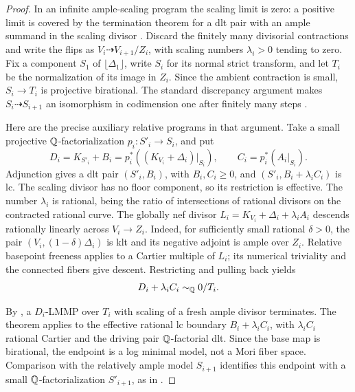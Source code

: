 \begin{proof}
In an infinite ample-scaling program the scaling limit is zero:
a positive limit is covered by the termination theorem for a
dlt pair with an ample summand in the scaling divisor
\cite[Theorem~1.9(ii), equivalently Theorem~4.1(ii)]
{Proj-Birkar2012Special}. Discard the finitely many divisorial
contractions and write the flips as \(V_i\dashrightarrow V_{i+1}/Z_i\),
with scaling numbers \(\lambda_i>0\) tending to zero.
Fix a component \(S_1\) of \(\lfloor\Delta_1\rfloor\), write
\(S_i\) for its normal strict transform, and let \(T_i\) be the
normalization of its image in \(Z_i\). Since the ambient contraction
is small, \(S_i\to T_i\) is projective birational. The standard
discrepancy argument makes \(S_i\dashrightarrow S_{i+1}\)
an isomorphism in codimension one after finitely many steps
\cite[proof of Lemma~3.6]{Proj-Birkar2010}.

Here are the precise auxiliary relative programs in that argument.
Take a small projective \(\mathbb{Q}\)-factorialization
\(p_i:S'_i\to S_i\), and put
\[
 D_i=K_{S'_i}+B_i=p_i^*((K_{V_i}+\Delta_i)|_{S_i}),
 \qquad C_i=p_i^*(A_i|_{S_i}).
\]
Adjunction gives a dlt pair \((S'_i,B_i)\), with \(B_i,C_i\geq0\),
and \((S'_i,B_i+\lambda_i C_i)\) is lc. The scaling divisor
has no floor component, so its restriction is effective.
The number \(\lambda_i\) is rational, being the ratio of
intersections of rational divisors on the contracted rational curve.
The globally nef divisor
\(L_i=K_{V_i}+\Delta_i+\lambda_i A_i\) descends rationally
linearly across \(V_i\to Z_i\). Indeed, for sufficiently small
rational \(\delta>0\), the pair
\((V_i,(1-\delta)\Delta_i)\) is klt and its negative adjoint
is ample over \(Z_i\). Relative basepoint freeness applies to a
Cartier multiple of \(L_i\); its numerical triviality and the
connected fibers give descent. Restricting and pulling back yields
\[
 D_i+\lambda_i C_i\sim_{\mathbb{Q}}0/T_i.
\]

By \cite[Theorem~1.1(3)]{Proj-Birkar2012Special}, a \(D_i\)-LMMP
over \(T_i\) with scaling of a fresh ample divisor terminates.
The theorem applies to the effective rational lc boundary
\(B_i+\lambda_i C_i\), with \(\lambda_i C_i\) rational Cartier
and the driving pair \(\mathbb{Q}\)-factorial dlt. Since the base map
is birational, the endpoint is a log minimal model, not a Mori
fiber space. Comparison with the relatively ample model
\(S_{i+1}\) identifies this endpoint with a small
\(\mathbb{Q}\)-factorialization \(S'_{i+1}\), as in
\cite[Remarks~2.9--2.10]{Proj-Birkar2012Special}.


\end{proof}
